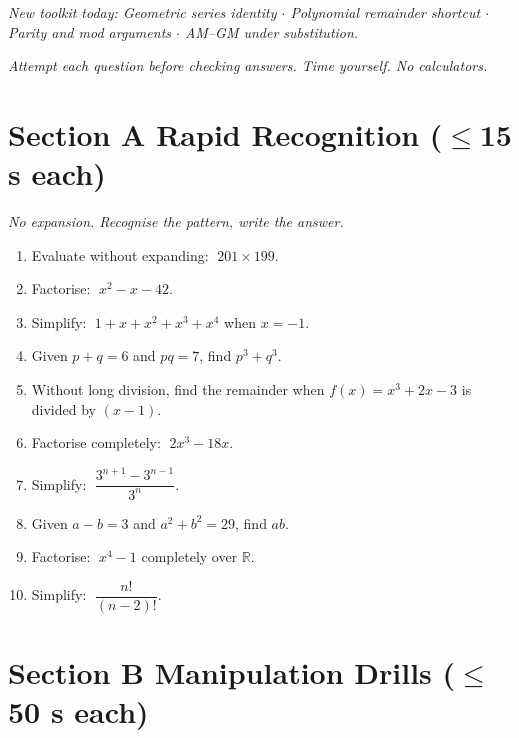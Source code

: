 \documentclass[11pt,a4paper]{article}
\begin{document}
\noindent\textit{New toolkit today: Geometric series identity $\cdot$ Polynomial remainder shortcut $\cdot$ Parity and mod arguments $\cdot$ AM--GM under substitution.}

\vspace{2pt}
\noindent\textit{Attempt each question before checking answers. Time yourself. No calculators.}

\section*{Section A \quad Rapid Recognition \hfill{\normalfont\small($\leq$15 s each)}}

\noindent\textit{No expansion. Recognise the pattern, write the answer.}

\begin{enumerate}

\item Evaluate without expanding: $\;201 \times 199$.

\item Factorise: $\;x^2 - x - 42$.

\item Simplify: $\;1 + x + x^2 + x^3 + x^4$ when $x = -1$.

\item Given $p + q = 6$ and $pq = 7$, find $p^3 + q^3$.

\item Without long division, find the remainder when $f(x)=x^3+2x-3$ is divided by $(x-1)$.

\item Factorise completely: $\;2x^3 - 18x$.

\item Simplify: $\;\dfrac{3^{n+1} - 3^{n-1}}{3^n}$.

\item Given $a - b = 3$ and $a^2 + b^2 = 29$, find $ab$.

\item Factorise: $\;x^4 - 1$ completely over $\mathbb{R}$.

\item Simplify: $\;\dfrac{n!}{(n-2)!}$.

\end{enumerate}

\section*{Section B \quad Manipulation Drills \hfill{\normalfont\small($\leq$50 s each)}}
\end{document}
